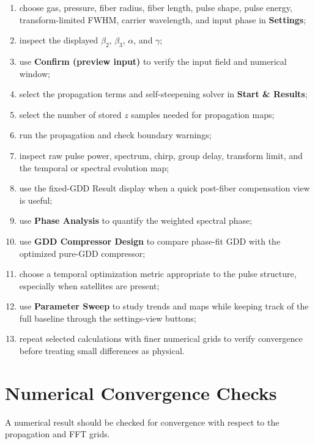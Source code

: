\documentclass[11pt,a4paper]{article}
\begin{document}
\begin{enumerate}
    \item choose gas, pressure, fiber radius, fiber length, pulse shape, pulse
    energy, transform-limited FWHM, carrier wavelength, and input phase in
    \textbf{Settings};
    \item inspect the displayed $\beta_2$, $\beta_3$, $\alpha$, and $\gamma$;
    \item use \textbf{Confirm (preview input)} to verify the input field and
    numerical window;
    \item select the propagation terms and self-steepening solver in
    \textbf{Start \& Results};
    \item select the number of stored $z$ samples needed for propagation maps;
    \item run the propagation and check boundary warnings;
    \item inspect raw pulse power, spectrum, chirp, group delay, transform
    limit, and the temporal or spectral evolution map;
    \item use the fixed-GDD Result display when a quick post-fiber compensation
    view is useful;
    \item use \textbf{Phase Analysis} to quantify the weighted spectral phase;
    \item use \textbf{GDD Compressor Design} to compare phase-fit GDD with the
    optimized pure-GDD compressor;
    \item choose a temporal optimization metric appropriate to the pulse
    structure, especially when satellites are present;
    \item use \textbf{Parameter Sweep} to study trends and maps while keeping
    track of the full baseline through the settings-view buttons;
    \item repeat selected calculations with finer numerical grids to verify
    convergence before treating small differences as physical.
\end{enumerate}

\section{Numerical Convergence Checks}

A numerical result should be checked for convergence with respect to the
propagation and FFT grids.
\end{document}
